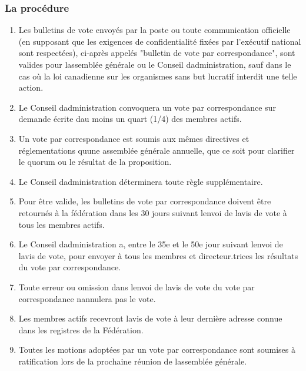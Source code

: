 \subsubsection{La procédure}
\label{la-procedure}

\begin{enumerate}
 \item
  Les bulletins de vote envoyés par la poste ou toute communication officielle (en supposant que les exigences de confidentialité fixées par l'exécutif national sont respectées), ci-après appelés "bulletin de vote par correspondance", sont valides pour l\textquotesingle assemblée générale ou le Conseil d\textquotesingle administration, sauf dans le cas où la loi canadienne sur les organismes sans but lucratif interdit une telle action.
 \item
  Le Conseil d\textquotesingle administration convoquera un vote par correspondance sur demande écrite d\textquotesingle au moins un quart (1/4) des membres actifs.
 \item
  Un vote par correspondance est soumis aux mêmes directives et réglementations qu\textquotesingle une assemblée générale annuelle, que ce soit pour clarifier le quorum ou le résultat de la proposition.
 \item
  Le Conseil d\textquotesingle administration déterminera toute règle supplémentaire.
 \item
  Pour être valide, les bulletins de vote par correspondance doivent être retournés à la fédération dans les 30 jours suivant l\textquotesingle envoi de l\textquotesingle avis de vote à tous les membres actifs.
 \item
  Le Conseil d\textquotesingle administration a, entre le 35e et le 50e jour suivant l\textquotesingle envoi de l\textquotesingle avis de vote, pour envoyer à tous les membres et directeur.trices les résultats du vote par correspondance.
 \item
  Toute erreur ou omission dans l\textquotesingle envoi de l\textquotesingle avis de vote du vote par correspondance n\textquotesingle annulera pas le vote.
 \item
  Les membres actifs recevront l\textquotesingle avis de vote à leur dernière adresse connue dans les registres de la Fédération.
 \item
  Toutes les motions adoptées par un vote par correspondance sont soumises à ratification lors de la prochaine réunion de l\textquotesingle assemblée générale.
\end{enumerate}

